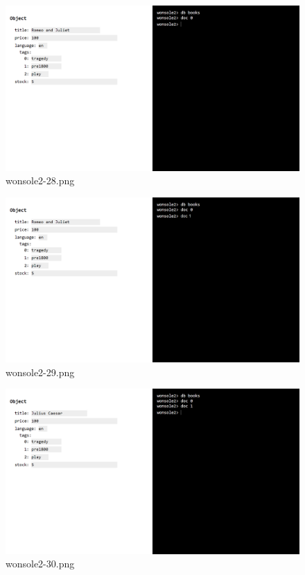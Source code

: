 \begin{figure}
\includegraphics[width=\textwidth]{screenshot/wonsole2/wonsole2-28.png}
\caption{wonsole2-28.png}
\label{wonsole2-28.png}
\end{figure}


\clearpage
\begin{figure}
\includegraphics[width=\textwidth]{screenshot/wonsole2/wonsole2-29.png}
\caption{wonsole2-29.png}
\label{wonsole2-29.png}
\end{figure}


\begin{figure}
\includegraphics[width=\textwidth]{screenshot/wonsole2/wonsole2-30.png}
\caption{wonsole2-30.png}
\label{wonsole2-30.png}
\end{figure}


